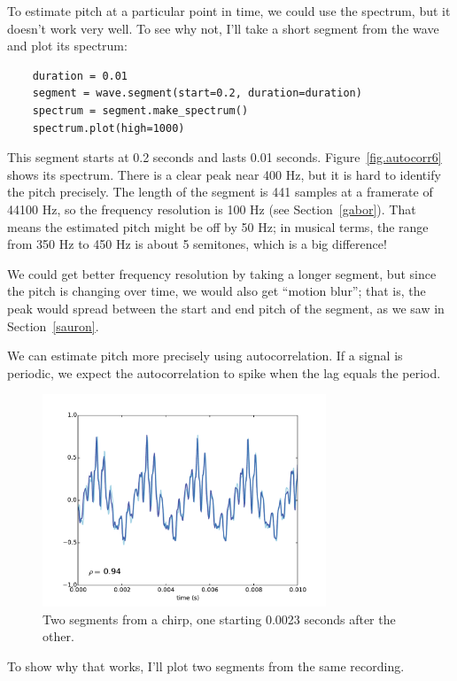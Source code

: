 \documentclass[12pt]{book}
\begin{document}
To estimate pitch at a particular point in time, we could use the
spectrum, but it doesn't work very well.  To see why not, I'll take
a short segment from the wave and plot its spectrum:

\begin{verbatim}
    duration = 0.01
    segment = wave.segment(start=0.2, duration=duration)
    spectrum = segment.make_spectrum()
    spectrum.plot(high=1000)
\end{verbatim}

This segment starts at 0.2 seconds and lasts 0.01 seconds.
Figure~\ref{fig.autocorr6} shows its spectrum.  There is a clear peak
near 400 Hz, but it is hard to identify the pitch precisely.  The
length of the segment is 441 samples at a framerate of 44100 Hz, so
the frequency resolution is 100 Hz (see Section~\ref{gabor}).
That means the estimated pitch might be off by 50 Hz; in musical
terms, the range from 350 Hz to 450 Hz is about 5 semitones, which is
a big difference!

We could get better frequency resolution by taking a longer segment,
but since the pitch is changing over time, we would also get ``motion
blur''; that is, the peak would spread between the start and end pitch of
the segment, as we saw in Section~\ref{sauron}.

We can estimate pitch more precisely using autocorrelation.
If a signal is periodic, we expect the autocorrelation to spike
when the lag equals the period.

\begin{figure}
\centerline{\includegraphics[height=2.5in]{figs/autocorr7.pdf}}
\caption{Two segments from a chirp, one starting 0.0023 seconds
after the other.}
\label{fig.autocorr7}
\end{figure}

To show why that works, I'll plot two segments from the same
recording.
\end{document}
